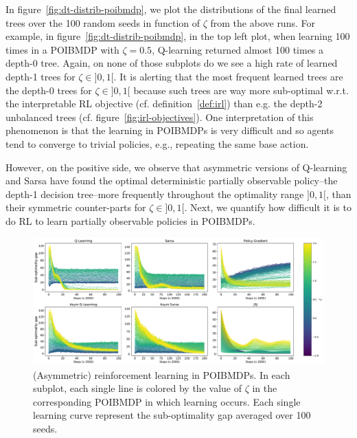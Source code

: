 In figure~\ref{fig:dt-distrib-poibmdp}, we plot the distributions of the final learned trees over the 100 random seeds in function of $\zeta$ from the above runs.
For example, in figure~\ref{fig:dt-distrib-poibmdp}, in the top left plot, when learning 100 times in a POIBMDP with $\zeta=0.5$, Q-learning returned almost 100 times a depth-0 tree.
Again, on none of those subplots do we see a high rate of learned depth-1 trees for $\zeta\in ]0, 1[$.
It is alerting that the most frequent learned trees are the depth-0 trees for $\zeta\in ]0, 1[$ because such trees are way more sub-optimal w.r.t. the interpretable RL objective (cf. definition~\ref{def:irl}) than e.g. the depth-2 unbalanced trees (cf. figure~\ref{fig:irl-objectives}).  
One interpretation of this phenomenon is that the learning in POIBMDPs is very difficult and so agents tend to converge to trivial policies, e.g., repeating the same base action.

However, on the positive side, we observe that asymmetric versions of Q-learning and Sarsa have found the optimal deterministic partially observable policy--the depth-1 decision tree--more frequently throughout the optimality range $]0,1[$, than their symmetric counter-parts for $\zeta\in ]0, 1[$.
Next, we quantify how difficult it is to do RL to learn partially observable policies in POIBMDPs.

\begin{figure}
    \centering
    \includegraphics[width=1\textwidth]{images/images_part1/learning_curves.pdf}
    \caption{(Asymmetric) reinforcement learning in POIBMDPs. 
    In each subplot, each single line is colored by the value of $\zeta$ in the corresponding POIBMDP in which learning occurs. 
    Each single learning curve represent the sub-optimality gap averaged over 100 seeds.
    }\label{fig:rl-poibmdp}
\end{figure}

